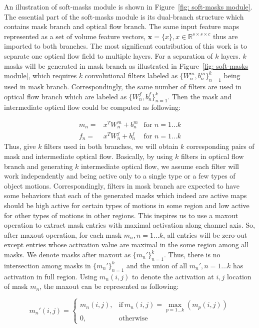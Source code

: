 \documentclass[10pt,twocolumn,letterpaper]{article}
\begin{document}
An illustration of soft-masks module is shown in Figure~\ref{fig: soft-masks module}. The essential part of the soft-masks module is its dual-branch structure which contains mask branch and optical flow branch. The same input feature maps represented as a set of volume feature vectors, $\textbf{x} = \{x\}, x \in \mathbb{R}^{s\times s \times c}$ thus are imported to both branches. The most significant contribution of this work is to separate one optical flow field to multiple layers. For a separation of $k$ layers. $k$ masks will be generated in mask branch as illustrated in Figure~\ref{fig: soft-masks module}, which requires $k$ convolutional filters labeled as $\{W_n^m, b_n^m\}_{n=1}^k$ being used in mask branch. Correspondingly, the same number of filters are used in optical flow branch which are labeled as $\{W_n^f, b_n^f\}_{n=1}^k$. Then the mask and intermediate optical flow could be computed as following:

\begin{align}
m_n =& x^T W_n^m + b_n^m &\! \text{for $n = 1\dots k$}\\
f_n =& x^T W_n^f + b_n^f &\! \text{for $n = 1\dots k$}
\end{align}
Thus, give $k$ filters used in both branches, we will obtain $k$ corresponding pairs of mask and intermediate optical flow. Basically, by using $k$ filters in optical flow branch and generating $k$ intermediate optical flow, we assume each filter will work independently and being active only to a single type or a few types of object motions. Correspondingly, filters in mask branch are expected to have some behaviors that each of the generated masks which indeed are active maps should be high active for certain types of motions in some region and low active for other types of motions in other regions. This inspires us to use a maxout operation to extract mask entries with maximal activation along channel axis. So, after maxout operation, for each mask $m_n, n=1\dots k$, all entries will be zero-out except entries whose activation value are maximal in the some region among all masks. We denote masks after maxout as $\{m_n'\}_{n=1}^k$. Thus, there is no intersection among masks in $\{m_n'\}_{n=1}^k$ and the union of all $m_n', n=1\dots k$ has activation in full region. Using $m_n(i, j)$ to denote the activation at $i, j$ location of mask $m_n$, the maxout can be represented as following:

\begin{equation}
m_n'(i, j)=
\begin{cases}
m_n(i, j), & \text{if}\ m_n(i, j) = \max\limits_{p=1\dots k}(m_p(i, j)) \\
0, & \text{otherwise}
\end{cases}
\end{equation}
\end{document}
